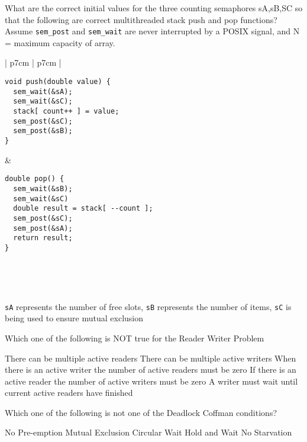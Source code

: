 \variant
What are the correct initial values for the three counting semaphores sA,sB,SC so that the following are correct multithreaded stack push and pop functions? Assume {\tt sem_post} and {\tt sem_wait}  are never interrupted by a POSIX signal, and N = maximum capacity of array.
\\
\begin{tabular}{ | p{7cm} | p{7cm} | }
\hline \begin{verbatim}void push(double value) {
  sem_wait(&sA);
  sem_wait(&sC);
  stack[ count++ ] = value;
  sem_post(&sC);
  sem_post(&sB);
} \end{verbatim} & \begin{verbatim}
double pop() {
  sem_wait(&sB);
  sem_wait(&sC)
  double result = stack[ --count ];
  sem_post(&sC);
  sem_post(&sA);
  return result;
}\end{verbatim} \\ \hline
\end{tabular}
\\
\begin{answers}
\end{answers}
\begin{solution}
{\tt sA} represents the number of free slots, {\tt sB} represents the number of items, {\tt sC} is being used to ensure mutual exclusion
\end{solution}





\variant
Which one of the following is NOT true for the Reader Writer Problem
\begin{answers}
\answer There can be multiple active readers
\correctanswer There can be multiple active writers
\answer When there is an active writer the number of active readers must be zero
\answer If there is an active reader the number of active writers must be zero
\answer A writer must wait until current active readers have finished
\end{answers}
\begin{solution}
\end{solution}


\variant
Which one of the following is not one of the Deadlock Coffman conditions?
\begin{answers}
\answer No Pre-emption
\answer Mutual Exclusion
\answer Circular Wait
\answer Hold and Wait
\correctanswer No Starvation
\end{answers}
\begin{solution}
\end{solution}



